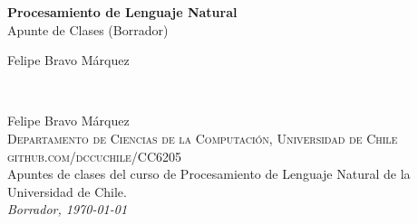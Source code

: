 \documentclass[11pt,fleqn]{book} %
\begin{document}

\begingroup
\thispagestyle{empty}
\centering
\vspace*{5cm}
\par\normalfont\fontsize{35}{35}\sffamily\selectfont
\textbf{Procesamiento de Lenguaje Natural}\\
{\LARGE Apunte de Clases (Borrador)}\par %
\vspace*{1cm}
{\Huge Felipe Bravo Márquez}\par %
\endgroup


\newpage
~\vfill
\thispagestyle{empty}

\noindent Felipe Bravo Márquez\\

\noindent \textsc{Departamento de Ciencias de la Computación, Universidad de Chile}\\

\noindent \textsc{github.com/dccuchile/CC6205}\\ %

\noindent Apuntes de clases del curso de Procesamiento de Lenguaje Natural de la Universidad de Chile.\\ %

\noindent \textit{Borrador, \today} %



\pagestyle{empty} %

\tableofcontents %


\pagestyle{fancy} %
\end{document}
